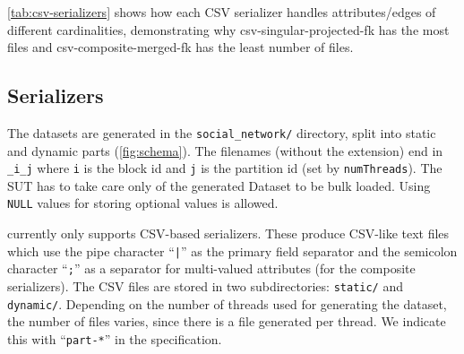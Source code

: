 




\autoref{tab:csv-serializers} shows how each CSV serializer handles attributes/edges of different cardinalities, demonstrating why \textsf{csv-singular-projected-fk} has the most files and \textsf{csv-composite-merged-fk} has the least number of files.







\subsection{Serializers}
\label{sec:serializers}

The datasets are generated in the \texttt{social\_network/} directory, split into static and dynamic parts (\autoref{fig:schema}).
The filenames (without the extension) end in \texttt{\_i\_j} where \texttt{i} is the block id and \texttt{j} is the partition id (set by \texttt{numThreads}).
The SUT has to take care only of the generated Dataset to be bulk loaded. Using \texttt{NULL} values for storing optional values is allowed.

\datagen currently only supports CSV-based serializers.
These produce CSV-like text files which use the pipe character ``\texttt{|}'' as the primary field separator and the semicolon character ``\texttt{;}'' as a separator for multi-valued attributes (for the composite serializers).
The CSV files are stored in two subdirectories: \texttt{static/} and \texttt{dynamic/}.
Depending on the number of threads used for generating the dataset, the number of files varies, since there is a file generated per thread. We indicate this with ``\texttt{part-*}'' in the specification.

